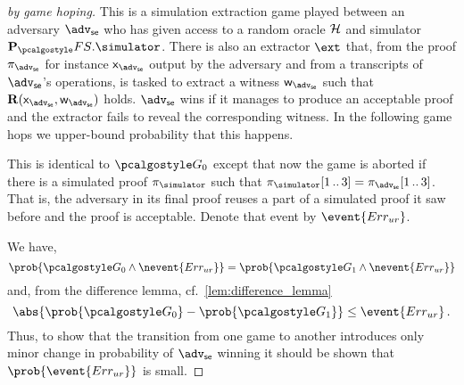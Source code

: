 \documentclass[runningheads,11pt]{llncs}
\theoremstyle{definition}
\begin{document}
\begin{proof}[by game hoping]
	This is a simulation extraction game played between an adversary $\advse$ who has given access to a random oracle $\mathcal{H}$ and simulator $\plonkprotfs.\simulator$. 
	There is also an extractor $\ext$ that, from the proof $\zkproof_\advse$ for instance $\inp_\advse$ output by the adversary and from a transcripts of $\advse$'s operations, is tasked to extract a witness $\wit_\advse$ such that $\REL(\inp_\advse, \wit_\advse)$ holds.
	$\advse$ wins if it manages to produce an acceptable proof and the extractor fails to reveal the corresponding witness.
	In the following game hops we upper-bound probability that this happens.
	
	
	This is identical to $\game{0}$ except that now the game is aborted if there is a simulated proof $\zkproof_\simulator$ such that $\zkproof_\simulator\range{1}{3} = \zkproof_\advse\range{1}{3}$. That is, the adversary in its final proof reuses a part of a simulated proof it saw before and the proof is acceptable.
	Denote that event by $\event{\errur}$.
	
	We have, 
	\[
		\prob{\game{0} \land \nevent{\errur}} = \prob{\game{1} \land \nevent{\errur}}
	\]
	and, from the difference lemma, cf.~\cref{lem:difference_lemma}
	\[
		\abs{\prob{\game{0}} - \prob{\game{1}}} \leq \event{\errur}\,.
	\]
	Thus, to show that the transition from one game to another introduces only minor change in probability of $\advse$ winning it should be shown that $\prob{\event{\errur}}$ is small.
	

\end{proof}
\end{document}
